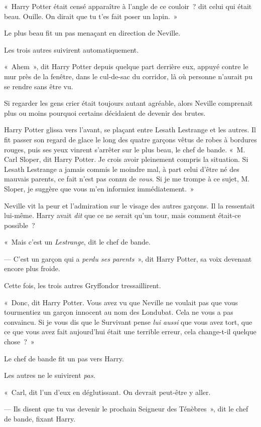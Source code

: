 «~Harry Potter était censé apparaître à l'angle de ce couloir~? dit celui qui était beau. Ouille. On dirait que tu t'es fait poser un lapin.~»

Le plus beau fit un pas menaçant en direction de Neville.

Les trois autres suivirent automatiquement.

«~Ahem~», dit Harry Potter depuis quelque part derrière eux, appuyé contre le mur près de la fenêtre, dans le cul-de-sac du corridor, là où personne n'aurait pu se rendre sans être vu.

Si regarder les gens crier était toujours autant agréable, alors Neville comprenait plus ou moins pourquoi certains décidaient de devenir des brutes.

Harry Potter glissa vers l'avant, se plaçant entre Lesath Lestrange et les autres. Il fit passer son regard de glace le long des quatre garçons vêtus de robes à bordures rouges, puis ses yeux vinrent s'arrêter sur le plus beau, le chef de bande. «~M. Carl Sloper, dit Harry Potter. Je crois avoir pleinement compris la situation. Si Lesath Lestrange a jamais commis le moindre mal, à part celui d'être né des mauvais parents, ce fait n'est pas connu de \emph{vous}. Si je me trompe à ce sujet, M. Sloper, je suggère que vous m'en informiez immédiatement.~»

Neville vit la peur et l'admiration sur le visage des autres garçons. Il la ressentait lui-même. Harry avait \emph{dit} que ce ne serait qu'un tour, mais comment était-ce possible~?

«~Mais c'est un \emph{Lestrange}, dit le chef de bande.

--- C'est un garçon qui a \emph{perdu ses parents}~», dit Harry Potter, sa voix devenant encore plus froide.

Cette fois, les trois autres Gryffondor tressaillirent.

«~Donc, dit Harry Potter. Vous avez vu que Neville ne voulait pas que vous tourmentiez un garçon innocent au nom des Londubat. Cela ne vous a pas convaincu. Si je vous dis que le Survivant pense \emph{lui aussi} que vous avez tort, que ce que vous avez fait aujourd'hui était une terrible erreur, cela change-t-il quelque chose~?~»

Le chef de bande fit un pas vers Harry.

Les autres ne le suivirent \emph{pas}.

«~Carl, dit l'un d'eux en déglutissant. On devrait peut-être y aller.

--- Ils disent que tu vas devenir le prochain Seigneur des Ténèbres~», dit le chef de bande, fixant Harry.

